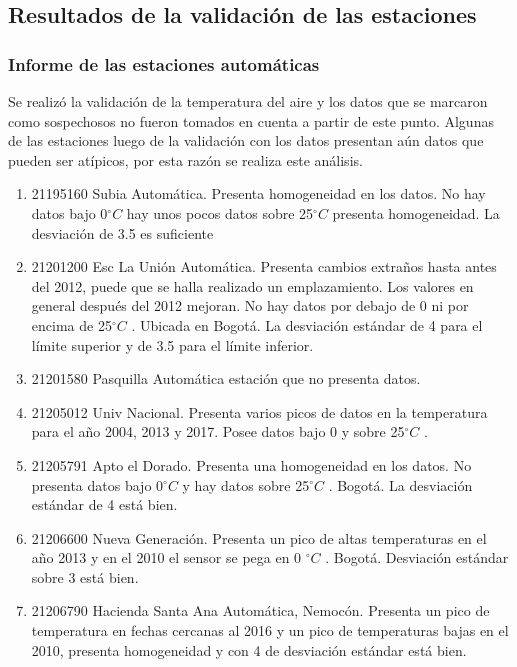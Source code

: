 \documentclass[11pt]{article}
\def\celc{$^{\circ}C$ }%
\begin{document}
\subsection{Resultados de la validación de las estaciones}

\subsubsection{Informe de las estaciones automáticas}

Se realizó la validación de la temperatura del aire y los datos que se marcaron como sospechosos no fueron tomados en cuenta a partir de este punto. Algunas de las estaciones luego de la validación con los datos presentan aún datos que pueden ser atípicos, por esta razón se realiza este análisis.

\begin{enumerate}


\item 21195160 Subia Automática. Presenta homogeneidad en los datos. No hay datos bajo 0\celc hay unos pocos datos sobre 25\celc presenta homogeneidad. La desviación de 3.5 es suficiente


\item 21201200 Esc La Unión Automática. Presenta cambios extraños hasta antes del 2012, puede que se halla realizado un emplazamiento. Los valores en general después del 2012 mejoran. No hay datos por debajo de 0 ni por encima de 25\celc. Ubicada en Bogotá. La desviación estándar de 4 para el límite superior y de 3.5 para el límite inferior.

\item 21201580 Pasquilla Automática estación que no presenta datos.

\item 21205012 Univ Nacional. Presenta varios picos de datos en la temperatura para el año 2004, 2013 y 2017. Posee datos bajo 0 y sobre 25\celc.

\item 21205791 Apto el Dorado. Presenta una homogeneidad en los datos. No presenta datos bajo 0\celc y hay datos sobre 25\celc. Bogotá. La desviación estándar de 4 está bien.

\item 21206600 Nueva Generación. Presenta un pico de altas temperaturas en el año 2013 y en el 2010 el sensor se pega en 0 \celc. Bogotá. Desviación estándar sobre 3 está bien.

\item 21206790 Hacienda Santa Ana Automática, Nemocón. Presenta un pico de temperatura en fechas cercanas al 2016 y un pico de temperaturas bajas en el 2010, presenta homogeneidad y con 4 de desviación estándar está bien.


\end{enumerate}
\end{document}
